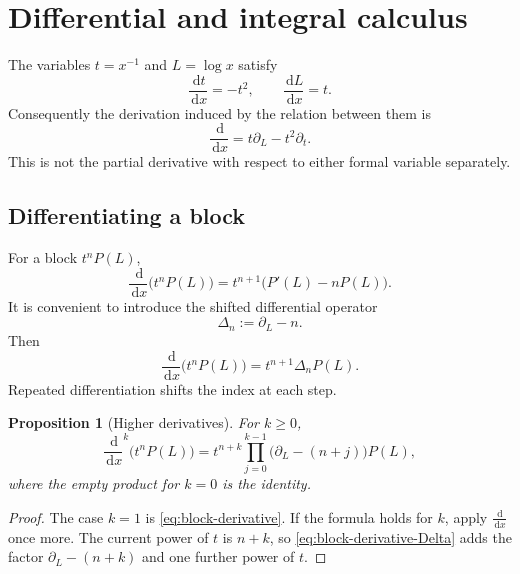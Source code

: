 \documentclass[11pt]{article}
\theoremstyle{pltheorem}
\newtheorem{proposition}[theorem]{Proposition}
\newcommand{\dd}{\,\mathrm d}
\newcommand{\D}{\frac{\dd}{\dd x}}
\begin{document}
\section{Differential and integral calculus}
\label{sec:differential-calculus}

The variables \(t=x^{-1}\) and \(L=\log x\) satisfy
\begin{equation}\label{eq:t-L-derivatives}
 \frac{\dd t}{\dd x}=-t^2,
 \qquad
 \frac{\dd L}{\dd x}=t.
\end{equation}
Consequently the derivation induced by the relation between them is
\begin{equation}\label{eq:D-operator}
 \D=t\partial_L-t^2\partial_t.
\end{equation}
This is not the partial derivative with respect to either formal variable separately.

\subsection{Differentiating a block}

For a block \(t^nP(L)\),
\begin{equation}\label{eq:block-derivative}
 \D\bigl(t^nP(L)\bigr)
 =t^{n+1}\bigl(P'(L)-nP(L)\bigr).
\end{equation}
It is convenient to introduce the shifted differential operator
\begin{equation}\label{eq:Delta-n}
 \Delta_n:=\partial_L-n.
\end{equation}
Then
\begin{equation}\label{eq:block-derivative-Delta}
 \D\bigl(t^nP(L)\bigr)=t^{n+1}\Delta_nP(L).
\end{equation}
Repeated differentiation shifts the index at each step.

\begin{proposition}[Higher derivatives]\label{prop:higher-derivative}
For \(k\ge0\),
\begin{equation}\label{eq:higher-derivative}
 \D^k\bigl(t^nP(L)\bigr)
 =t^{n+k}
 \prod_{j=0}^{k-1}\bigl(\partial_L-(n+j)\bigr)P(L),
\end{equation}
where the empty product for \(k=0\) is the identity.
\end{proposition}

\begin{proof}
The case \(k=1\) is \cref{eq:block-derivative}.  If the formula holds for \(k\), apply \(\D\) once more.  The current power of \(t\) is \(n+k\), so \cref{eq:block-derivative-Delta} adds the factor
\(\partial_L-(n+k)\) and one further power of \(t\).
\end{proof}
\end{document}
